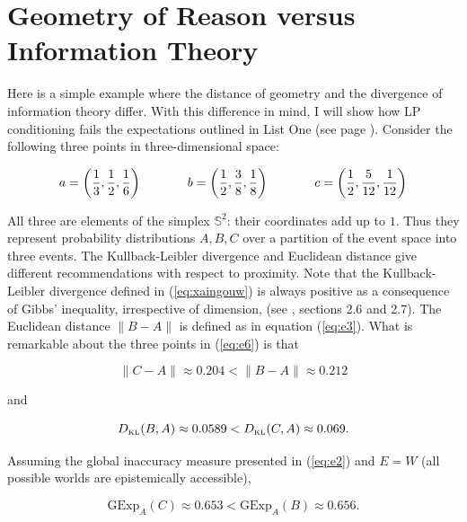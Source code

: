 \documentclass[phd,12pt,oneside]{ubcthesis}
\begin{document}
\section{Geometry of Reason versus Information Theory}
\label{sec:shahseid}

Here is a simple example where the distance of geometry and the
divergence of information theory differ. With this difference in mind,
I will show how LP conditioning fails the expectations outlined in
List One (see page \pageref{page:listone}). Consider the following three
points in three-dimensional space:

\begin{equation}
  \label{eq:e6}
    a=\left(\frac{1}{3},\frac{1}{2},\frac{1}{6}\right) \hspace{.5in}
    b=\left(\frac{1}{2},\frac{3}{8},\frac{1}{8}\right)  \hspace{.5in}
    c=\left(\frac{1}{2},\frac{5}{12},\frac{1}{12}\right)
\end{equation}

All three are elements of the simplex $\mathbb{S}^{2}$: their
coordinates add up to $1$. Thus they represent probability
distributions $A,B,C$ over a partition of the event space into three
events. The Kullback-Leibler divergence and Euclidean distance give
different re\-commendations with respect to proximity. Note that the
Kullback-Leibler divergence defined in (\ref{eq:xaingouw}) is always
positive as a consequence of Gibbs' inequality, irrespective of
dimension, (see , sections 2.6 and 2.7). The
Euclidean distance $\|B-A\|$ is defined as in equation (\ref{eq:e3}).
What is remarkable about the three points in (\ref{eq:e6}) is that

\begin{equation}
  \label{eq:e8}
  \|C-A\|\approx{}0.204<\|B-A\|\approx{}0.212
\end{equation}

and

\begin{equation}
  \label{eq:e9}
  D_{\mbox{\tiny KL}}(B,A)\approx{}0.0589<D_{\mbox{\tiny KL}}(C,A)\approx{}0.069.
\end{equation}

{\noindent}Assuming the global inaccuracy measure presented in (\ref{eq:e2}) and
$E=W$ (all possible worlds are epistemically accessible),

\begin{equation}
  \label{eq:e8a}
  \mbox{GExp}_{A}(C)\approx{}0.653<\mbox{GExp}_{A}(B)\approx{}0.656.
\end{equation}
\end{document}
